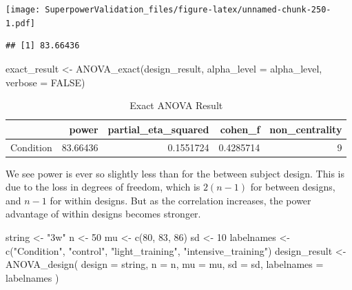 \documentclass[
]{book}
\newenvironment{Shaded}{\begin{snugshade}}{\end{snugshade}}
\newcommand{\AttributeTok}[1]{\textcolor[rgb]{0.77,0.63,0.00}{#1}}
\newcommand{\ConstantTok}[1]{\textcolor[rgb]{0.00,0.00,0.00}{#1}}
\newcommand{\DecValTok}[1]{\textcolor[rgb]{0.00,0.00,0.81}{#1}}
\newcommand{\FunctionTok}[1]{\textcolor[rgb]{0.00,0.00,0.00}{#1}}
\newcommand{\NormalTok}[1]{#1}
\newcommand{\OtherTok}[1]{\textcolor[rgb]{0.56,0.35,0.01}{#1}}
\newcommand{\SpecialCharTok}[1]{\textcolor[rgb]{0.00,0.00,0.00}{#1}}
\newcommand{\StringTok}[1]{\textcolor[rgb]{0.31,0.60,0.02}{#1}}
\begin{document}
\texttt{[image: SuperpowerValidation\_files/figure-latex/unnamed-chunk-250-1.pdf]}

\begin{Shaded}
\end{Shaded}

\begin{verbatim}
## [1] 83.66436
\end{verbatim}

\begin{Shaded}
\begin{Highlighting}[]
\NormalTok{exact\_result }\OtherTok{\textless{}{-}} \FunctionTok{ANOVA\_exact}\NormalTok{(design\_result,}
                            \AttributeTok{alpha\_level =}\NormalTok{ alpha\_level,}
                            \AttributeTok{verbose =} \ConstantTok{FALSE}\NormalTok{)}
\end{Highlighting}
\end{Shaded}

\begin{table}[!h]

\caption{\label{tab:unnamed-chunk-252}Exact ANOVA Result}
\centering
\begin{tabular}[t]{l|r|r|r|r}
\hline
  & power & partial\_eta\_squared & cohen\_f & non\_centrality\\
\hline
Condition & 83.66436 & 0.1551724 & 0.4285714 & 9\\
\hline
\end{tabular}
\end{table}

We see power is ever so slightly less than for the between subject design. This is due to the loss in degrees of freedom, which is \(2(n-1)\) for between designs, and \(n-1\) for within designs. But as the correlation increases, the power advantage of within designs becomes stronger.

\begin{Shaded}
\begin{Highlighting}[]
\NormalTok{string }\OtherTok{\textless{}{-}} \StringTok{"3w"}
\NormalTok{n }\OtherTok{\textless{}{-}} \DecValTok{50}
\NormalTok{mu }\OtherTok{\textless{}{-}} \FunctionTok{c}\NormalTok{(}\DecValTok{80}\NormalTok{, }\DecValTok{83}\NormalTok{, }\DecValTok{86}\NormalTok{)}
\NormalTok{sd }\OtherTok{\textless{}{-}} \DecValTok{10}
\NormalTok{labelnames }\OtherTok{\textless{}{-}} \FunctionTok{c}\NormalTok{(}\StringTok{"Condition"}\NormalTok{, }\StringTok{"control"}\NormalTok{, }\StringTok{"light\_training"}\NormalTok{, }\StringTok{"intensive\_training"}\NormalTok{)}
\NormalTok{design\_result }\OtherTok{\textless{}{-}} \FunctionTok{ANOVA\_design}\NormalTok{(}
  \AttributeTok{design =}\NormalTok{ string,}
  \AttributeTok{n =}\NormalTok{ n,}
  \AttributeTok{mu =}\NormalTok{ mu,}
  \AttributeTok{sd =}\NormalTok{ sd,}
  \AttributeTok{labelnames =}\NormalTok{ labelnames}
\NormalTok{)}
\end{Highlighting}
\end{Shaded}
\end{document}
